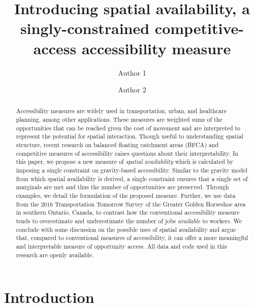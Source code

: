 \documentclass[]{elsarticle} %
\begin{document}
\begin{frontmatter}

  \title{Introducing spatial availability, a singly-constrained
competitive-access accessibility measure}
    \author[School]{Author 1}
    \author[School]{Author 2}
      \address[School]{Some School}
  
  \begin{abstract}
  Accessibility measures are widely used in transportation, urban, and
  healthcare planning, among other applications. These measures are
  weighted sums of the opportunities that can be reached given the cost
  of movement and are interpreted to represent the potential for spatial
  interaction. Though useful to understanding spatial structure, recent
  research on balanced floating catchment areas (BFCA) and competitive
  measures of accessibility raises questions about their
  interpretability. In this paper, we propose a new measure of
  \emph{spatial availability} which is calculated by imposing a single
  constraint on gravity-based accessibility. Similar to the gravity
  model from which spatial availability is derived, a single constraint
  ensures that a single set of marginals are met and thus the number of
  opportunities are preserved. Through examples, we detail the
  formulation of the proposed measure. Further, we use data from the
  2016 Transportation Tomorrow Survey of the Greater Golden Horseshoe
  area in southern Ontario, Canada, to contrast how the conventional
  accessibility measure tends to overestimate and underestimate the
  number of jobs \emph{available} to workers. We conclude with some
  discussion on the possible uses of spatial availability and argue
  that, compared to conventional measures of accessibility, it can offer
  a more meaningful and interpretable measure of opportunity access. All
  data and code used in this research are openly available.
  \end{abstract}
  
 \end{frontmatter}

\newpage

\hypertarget{introduction}{%
\section{Introduction}\label{introduction}}
\end{document}
